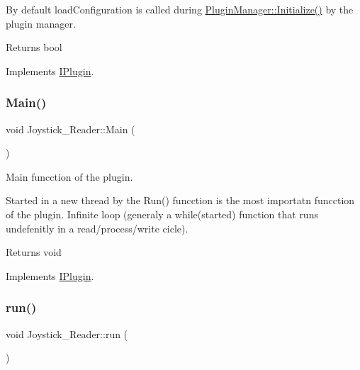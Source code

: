 By default load\+Configuration is called during \hyperlink{class_plugin_manager_a956e653b7db36da9d034b4a93c8308d5}{Plugin\+Manager\+::\+Initialize()} by the plugin manager.

\begin{DoxyReturn}{Returns}
bool 
\end{DoxyReturn}


Implements \hyperlink{class_i_plugin_a418cff309436d3a15d9a4ce7369db6dd}{I\+Plugin}.

\mbox{\label{class_joystick___reader_a5e5233926fb917ac45131b095afecdb8}} 
\subsubsection{\texorpdfstring{Main()}{Main()}}
{\footnotesize\ttfamily void Joystick\+\_\+\+Reader\+::\+Main (\begin{DoxyParamCaption}{ }\end{DoxyParamCaption})\hspace{0.3cm}{\ttfamily [virtual]}}



Main funcction of the plugin. 

Started in a new thread by the Run() funcction is the most importatn funcction of the plugin. Infinite loop (generaly a while(started) function that runs undefenitly in a read/process/write cicle). \begin{DoxyReturn}{Returns}
void 
\end{DoxyReturn}


Implements \hyperlink{class_i_plugin_ab5fdb3b0f7afdcee04324dca01766749}{I\+Plugin}.

\mbox{\label{class_joystick___reader_abb81b93f1ca6f574c007a02188f6dd1e}} 
\subsubsection{\texorpdfstring{run()}{run()}}
{\footnotesize\ttfamily void Joystick\+\_\+\+Reader\+::run (\begin{DoxyParamCaption}{ }\end{DoxyParamCaption})\hspace{0.3cm}{\ttfamily [virtual]}}



